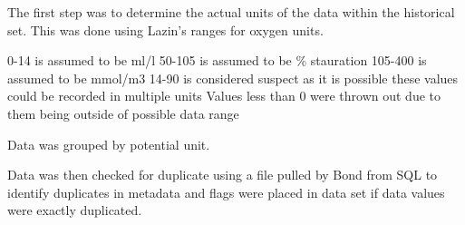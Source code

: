 \documentclass[]{article}
\newenvironment{Shaded}{\begin{snugshade}}{\end{snugshade}}
\newcommand{\KeywordTok}[1]{\textcolor[rgb]{0.13,0.29,0.53}{\textbf{#1}}}
\newcommand{\DecValTok}[1]{\textcolor[rgb]{0.00,0.00,0.81}{#1}}
\newcommand{\StringTok}[1]{\textcolor[rgb]{0.31,0.60,0.02}{#1}}
\newcommand{\CommentTok}[1]{\textcolor[rgb]{0.56,0.35,0.01}{\textit{#1}}}
\newcommand{\ControlFlowTok}[1]{\textcolor[rgb]{0.13,0.29,0.53}{\textbf{#1}}}
\newcommand{\OperatorTok}[1]{\textcolor[rgb]{0.81,0.36,0.00}{\textbf{#1}}}
\newcommand{\NormalTok}[1]{#1}
\begin{document}
The first step was to determine the actual units of the data within the
historical set. This was done using Lazin's ranges for oxygen units.

0-14 is assumed to be ml/l 50-105 is assumed to be \% stauration 105-400
is assumed to be mmol/m3 14-90 is considered suspect as it is possible
these values could be recorded in multiple units Values less than 0 were
thrown out due to them being outside of possible data range

Data was grouped by potential unit.

\begin{Shaded}
\end{Shaded}

Data was then checked for duplicate using a file pulled by Bond from SQL
to identify duplicates in metadata and flags were placed in data set if
data values were exactly duplicated.

\begin{Shaded}
\end{Shaded}
\end{document}
